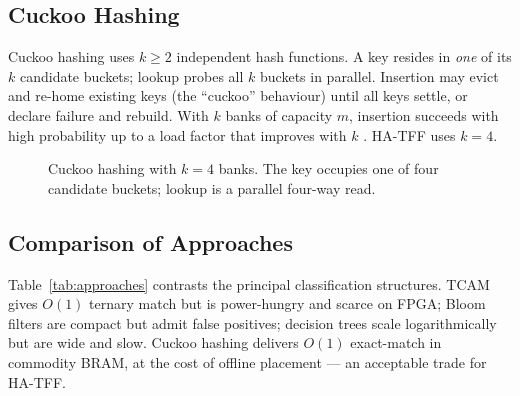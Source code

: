 \documentclass[12pt,twoside,openright]{book}
\begin{document}
\subsection{Cuckoo Hashing}
\label{sec:cuckoo}

Cuckoo hashing \cite{pagh2001} uses $k\ge 2$ independent hash functions. A key resides in
\emph{one} of its $k$ candidate buckets; lookup probes all $k$ buckets in parallel. Insertion may
evict and re-home existing keys (the ``cuckoo'' behaviour) until all keys settle, or declare
failure and rebuild. With $k$ banks of capacity $m$, insertion succeeds with high probability up to
a load factor that improves with $k$ \cite{fotakis2005}. HA-TFF uses $k=4$.

\begin{figure}[H]
\centering
\footnotesize
{}
\caption{Cuckoo hashing with $k=4$ banks. The key occupies one of four candidate buckets; lookup is
a parallel four-way read.}
\label{fig:cuckoo}
\end{figure}

\subsection{Comparison of Approaches}

Table~\ref{tab:approaches} contrasts the principal classification structures. TCAM gives $O(1)$
ternary match but is power-hungry and scarce on FPGA; Bloom filters are compact but admit false
positives; decision trees scale logarithmically but are wide and slow. Cuckoo hashing delivers
$O(1)$ exact-match in commodity BRAM, at the cost of offline placement --- an acceptable trade for
HA-TFF.
\end{document}
